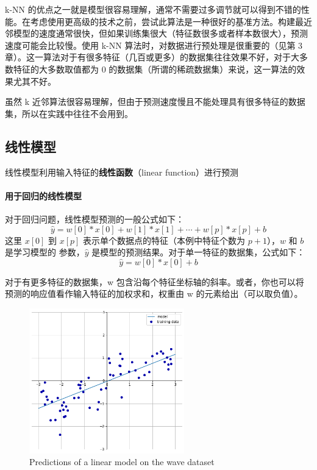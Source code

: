 k-NN 的优点之一就是模型很容易理解，通常不需要过多调节就可以得到不错的性能。在考虑使用更高级的技术之前，尝试此算法是一种很好的基准方法。构建最近邻模型的速度通常很快，但如果训练集很大（特征数很多或者样本数很大），预测速度可能会比较慢。使用 k-NN 算法时，对数据进行预处理是很重要的（见第 3 章）。这一算法对于有很多特征（几百或更多）的数据集往往效果不好，对于大多数特征的大多数取值都为 0 的数据集（所谓的稀疏数据集）来说，这一算法的效果尤其不好。

虽然 k 近邻算法很容易理解，但由于预测速度慢且不能处理具有很多特征的数据集，所以在实践中往往不会用到。

\subsection{线性模型}
线性模型利用输入特征的\textbf{线性函数}（linear function）进行预测

\paragraph{用于回归的线性模型} 对于回归问题，线性模型预测的一般公式如下：
\begin{equation*}
    \hat{y} = w[0] * x[0] + w[1] * x[1] + \cdots + w[p] * x[p] + b
\end{equation*}
这里 $x[0]$ 到 $x[p]$ 表示单个数据点的特征（本例中特征个数为 $p+1$），$w$ 和 $b$ 是学习模型的
参数，$\hat{y}$ 是模型的预测结果。对于单一特征的数据集，公式如下：
\begin{equation*}
    \hat{y} = w[0] * x[0] + b
\end{equation*}

对于有更多特征的数据集，w 包含沿每个特征坐标轴的斜率。或者，你也可以将预测的响应值看作输入特征的加权求和，权重由 w 的元素给出（可以取负值）。


\begin{figure}
    \centering
    \includegraphics[width=0.6\textwidth]{../Codes/Figures/Predictions of a linear model on the wave dataset.png}
    \caption{Predictions of a linear model on the wave dataset}
    \label{Predictions of a linear model on the wave dataset}
\end{figure}

